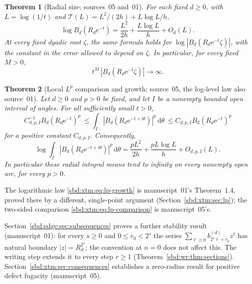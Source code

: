 \documentclass[11pt,a4paper]{article}
\newtheorem{theorem}{Theorem}[section]
\theoremstyle{definition}
\newcommand{\e}{\mathrm e}
\newcommand{\ii}{\mathrm i}
\newcommand{\dd}{\,\mathrm d}
\begin{document}
\begin{theorem}[Radial size; sources~05 and~01]
\label{sbd:xtm:thm:main-growth}
For each fixed $d\ge0$, with $L=\log(1/t)$ and
$\mathcal T(L)=L^2/(2h)+L\log L/h$,
\begin{equation}\label{sbd:xtm:eq:growth-main}
 \log B_d(R_d\e^{-t})
 =\frac{L^2}{2h}+\frac{L\log L}{h}+O_d(L).
\end{equation}
At every fixed dyadic root $\zeta$, the same formula holds for
$\log|B_d(R_d\e^{-t}\zeta)|$, with the constant in the error allowed to
depend on $\zeta$. In particular, for every fixed $M>0$,
\begin{equation}\label{sbd:xtm:eq:superpole}
 t^M\,|B_d(R_d\e^{-t}\zeta)|\longrightarrow\infty.
\end{equation}
\end{theorem}

\begin{theorem}[Local $L^p$ comparison and growth; source~05, the log-level law also source~01]
\label{sbd:xtm:thm:main-lp}
Let $d\ge0$ and $p>0$ be fixed, and let $I$ be a nonempty bounded open
interval of angles. For all sufficiently small $t>0$,
\begin{equation}\label{sbd:xtm:eq:lp-comparison}
 C_{d,p,I}^{-1}B_d(R_d\e^{-t})^p
 \ \le\int_I |B_d(R_d\e^{-t+\ii\theta})|^p\dd\theta
 \ \le C_{d,p,I}B_d(R_d\e^{-t})^p
\end{equation}
for a positive constant $C_{d,p,I}$. Consequently,
\begin{equation}\label{sbd:xtm:eq:lp-growth}
 \log\int_I |B_d(R_d\e^{-t+\ii\theta})|^p\dd\theta
 =\frac{pL^2}{2h}+\frac{pL\log L}{h}+O_{d,p,I}(L).
\end{equation}
In particular these radial integral means tend to infinity on every
nonempty open arc, for every $p>0$.
\end{theorem}
The logarithmic law \eqref{sbd:xtm:eq:lp-growth} is manuscript~01's
Theorem~1.4, proved there by a different, single-point argument
(Section~\ref{sbd:xtm:sec:lp}); the two-sided comparison
\eqref{sbd:xtm:eq:lp-comparison} is manuscript~05's.

Section~\ref{sbd:edge:sec:subsequences} proves a further stability result
(manuscript~01): for every $s\ge0$ and $0\le r_0<2^s$ the series
$\sum_{\ell\ge0}b_{2^s\ell+r_0}^{(d)}z^\ell$ has natural boundary
$|z|=R_d^{2^s}$; the convention at $n=0$ does not affect this. The writing
step extends it to every step $r\ge1$
(Theorem~\ref{sbd:wr:thm:sections}). Section~\ref{sbd:xtm:sec:consequences}
establishes a zero-radius result for positive defect fugacity
(manuscript~05).
\end{document}
